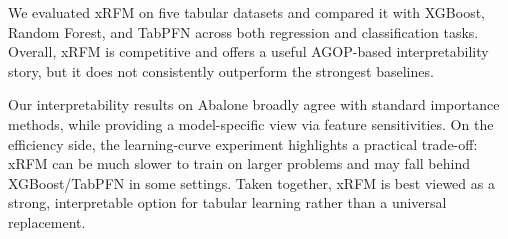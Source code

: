 We evaluated xRFM on five tabular datasets and compared it with XGBoost, Random Forest, and TabPFN across both regression and classification tasks. Overall, xRFM is competitive and offers a useful AGOP-based interpretability story, but it does not consistently outperform the strongest baselines.

Our interpretability results on Abalone broadly agree with standard importance methods, while providing a model-specific view via feature sensitivities. On the efficiency side, the learning-curve experiment highlights a practical trade-off: xRFM can be much slower to train on larger problems and may fall behind XGBoost/TabPFN in some settings. Taken together, xRFM is best viewed as a strong, interpretable option for tabular learning rather than a universal replacement.